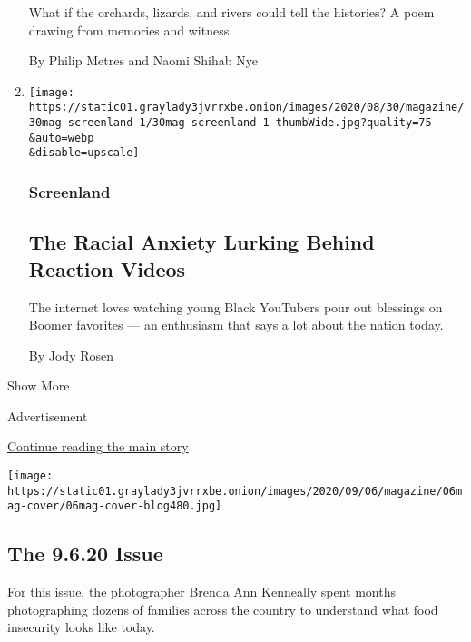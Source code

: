 \begin{enumerate}
  What if the orchards, lizards, and rivers could tell the histories? A
  poem drawing from memories and witness.

  By Philip Metres and Naomi Shihab Nye
\item
  \href{/2020/08/27/magazine/the-racial-anxiety-lurking-behind-reaction-videos.html}{}

  \texttt{[image: https://static01.graylady3jvrrxbe.onion/images/2020/08/30/magazine/30mag-screenland-1/30mag-screenland-1-thumbWide.jpg?quality=75\\\&auto=webp\\\&disable=upscale]}

  \hypertarget{screenland}{%
  \subsubsection{Screenland}\label{screenland}}

  \hypertarget{the-racial-anxiety-lurking-behind-reaction-videos}{%
  \subsection{The Racial Anxiety Lurking Behind Reaction
  Videos}\label{the-racial-anxiety-lurking-behind-reaction-videos}}

  The internet loves watching young Black YouTubers pour out blessings
  on Boomer favorites --- an enthusiasm that says a lot about the nation
  today.

  By Jody Rosen
\end{enumerate}

Show More

Advertisement

\protect\hyperlink{after-mid2}{Continue reading the main story}

\href{https://www.nytimes3xbfgragh.onion/issue/magazine/2020/09/04/the-9620-issue}{}

\texttt{[image: https://static01.graylady3jvrrxbe.onion/images/2020/09/06/magazine/06mag-cover/06mag-cover-blog480.jpg]}

\href{https://www.nytimes3xbfgragh.onion/issue/magazine/2020/09/04/the-9620-issue}{}

\hypertarget{the-9620-issue}{%
\subsection{The 9.6.20 Issue}\label{the-9620-issue}}

For this issue, the photographer Brenda Ann Kenneally spent months
photographing dozens of families across the country to understand what
food insecurity looks like today.

